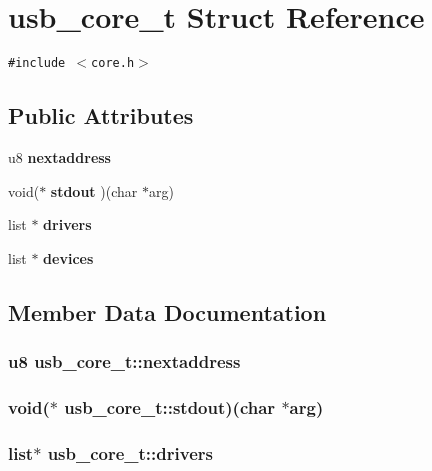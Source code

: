 \section{usb\_\-core\_\-t Struct Reference}
\label{structusb__core__t}
{\tt \#include $<$core.h$>$}

\subsection*{Public Attributes}
\begin{CompactItemize}
\item 
u8 {\bf nextaddress}
\item 
void($\ast$ {\bf stdout} )(char $\ast$arg)
\item 
list $\ast$ {\bf drivers}
\item 
list $\ast$ {\bf devices}
\end{CompactItemize}


\subsection{Member Data Documentation}
\subsubsection{\setlength{\rightskip}{0pt plus 5cm}u8 {\bf usb\_\-core\_\-t::nextaddress}}\label{structusb__core__t_4ed68f7d87a19984777b841b3c96e494}


\subsubsection{\setlength{\rightskip}{0pt plus 5cm}void($\ast$ {\bf usb\_\-core\_\-t::stdout})(char $\ast$arg)}\label{structusb__core__t_b9bf335d756243d9965b975db8f853a1}


\subsubsection{\setlength{\rightskip}{0pt plus 5cm}list$\ast$ {\bf usb\_\-core\_\-t::drivers}}\label{structusb__core__t_db8298483e9b41c795618e33e2038013}


